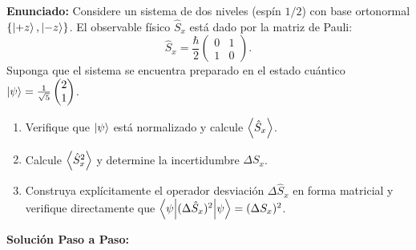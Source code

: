 \begin{ejemplobox}
    \textbf{Enunciado:} Considere un sistema de dos niveles (espín $1/2$) con base ortonormal $\{\left| +z \right\rangle, \left| -z \right\rangle\}$. El observable físico $\hat{S}_x$ está dado por la matriz de Pauli:
    \begin{equation}
        \hat{S}_x = \frac{\hbar}{2}\begin{pmatrix} 0 & 1 \\ 1 & 0 \end{pmatrix}.
    \end{equation}
    Suponga que el sistema se encuentra preparado en el estado cuántico $\left| \psi \right\rangle = \frac{1}{\sqrt{5}}\begin{pmatrix} 2 \\ 1 \end{pmatrix}$.
    \begin{enumerate}
        \item Verifique que $\left| \psi \right\rangle$ está normalizado y calcule $\left\langle \hat{S}_x \right\rangle$.
        \item Calcule $\left\langle \hat{S}_x^2 \right\rangle$ y determine la incertidumbre $\Delta S_x$.
        \item Construya explícitamente el operador desviación $\Delta\hat{S}_x$ en forma matricial y verifique directamente que $\left\langle \psi \middle| (\Delta\hat{S}_x)^2 \middle| \psi \right\rangle = (\Delta S_x)^2$.
    \end{enumerate}

    \textbf{Solución Paso a Paso:}
    

\end{ejemplobox}
